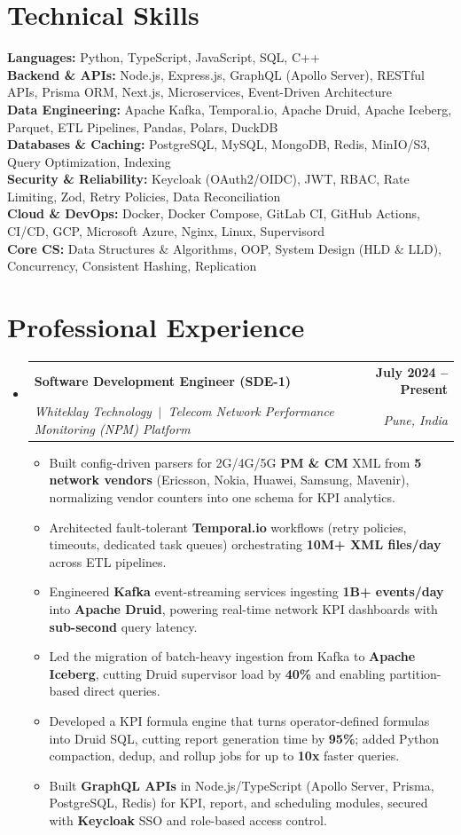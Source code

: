 \documentclass[a4paper,11pt]{article}
\makeatletter
\newcommand{\resumeItem}[1]{
  \item\small{#1 \vspace{-2pt}}
}
\newcommand{\resumeSubheading}[4]{
  \vspace{-2pt}\item
    \begin{tabular*}{0.97\textwidth}[t]{l@{\extracolsep{\fill}}r}
      \textbf{#1} & \textbf{\small #2} \\
      \textit{\small#3} & \textit{\small #4} \\
    \end{tabular*}\vspace{-7pt}
}
\newcommand{\resumeSubHeadingListStart}{\begin{itemize}[leftmargin=0.15in, label={}, topsep=2pt]}
\newcommand{\resumeSubHeadingListEnd}{\end{itemize}}
\newcommand{\resumeItemListStart}{\begin{itemize}[leftmargin=0.2in, itemsep=0pt, topsep=2pt]}
\newcommand{\resumeItemListEnd}{\end{itemize}\vspace{-5pt}}
\makeatother
\begin{document}
\section{Technical Skills}
\begin{itemize}[leftmargin=0.15in, label={}, topsep=2pt]
  \small{\item{
    \textbf{Languages:} Python, TypeScript, JavaScript, SQL, C++ \\
    \textbf{Backend \& APIs:} Node.js, Express.js, GraphQL (Apollo Server), RESTful APIs, Prisma ORM, Next.js, Microservices, Event-Driven Architecture \\
    \textbf{Data Engineering:} Apache Kafka, Temporal.io, Apache Druid, Apache Iceberg, Parquet, ETL Pipelines, Pandas, Polars, DuckDB \\
    \textbf{Databases \& Caching:} PostgreSQL, MySQL, MongoDB, Redis, MinIO/S3, Query Optimization, Indexing \\
    \textbf{Security \& Reliability:} Keycloak (OAuth2/OIDC), JWT, RBAC, Rate Limiting, Zod, Retry Policies, Data Reconciliation \\
    \textbf{Cloud \& DevOps:} Docker, Docker Compose, GitLab CI, GitHub Actions, CI/CD, GCP, Microsoft Azure, Nginx, Linux, Supervisord \\
    \textbf{Core CS:} Data Structures \& Algorithms, OOP, System Design (HLD \& LLD), Concurrency, Consistent Hashing, Replication
  }}
\end{itemize}

\section{Professional Experience}
\resumeSubHeadingListStart
  \resumeSubheading{Software Development Engineer (SDE-1)}{July 2024 -- Present}
    {Whiteklay Technology \,$|$\, Telecom Network Performance Monitoring (NPM) Platform}{Pune, India}
  \resumeItemListStart
    \resumeItem{Built config-driven parsers for 2G/4G/5G \textbf{PM \& CM} XML from \textbf{5 network vendors} (Ericsson, Nokia, Huawei, Samsung, Mavenir), normalizing vendor counters into one schema for KPI analytics.}
    \resumeItem{Architected fault-tolerant \textbf{Temporal.io} workflows (retry policies, timeouts, dedicated task queues) orchestrating \textbf{10M+ XML files/day} across ETL pipelines.}
    \resumeItem{Engineered \textbf{Kafka} event-streaming services ingesting \textbf{1B+ events/day} into \textbf{Apache Druid}, powering real-time network KPI dashboards with \textbf{sub-second} query latency.}
    \resumeItem{Led the migration of batch-heavy ingestion from Kafka to \textbf{Apache Iceberg}, cutting Druid supervisor load by \textbf{40\%} and enabling partition-based direct queries.}
    \resumeItem{Developed a KPI formula engine that turns operator-defined formulas into Druid SQL, cutting report generation time by \textbf{95\%}; added Python compaction, dedup, and rollup jobs for up to \textbf{10x} faster queries.}
    \resumeItem{Built \textbf{GraphQL APIs} in Node.js/TypeScript (Apollo Server, Prisma, PostgreSQL, Redis) for KPI, report, and scheduling modules, secured with \textbf{Keycloak} SSO and role-based access control.}
  \resumeItemListEnd
\resumeSubHeadingListEnd
\end{document}
